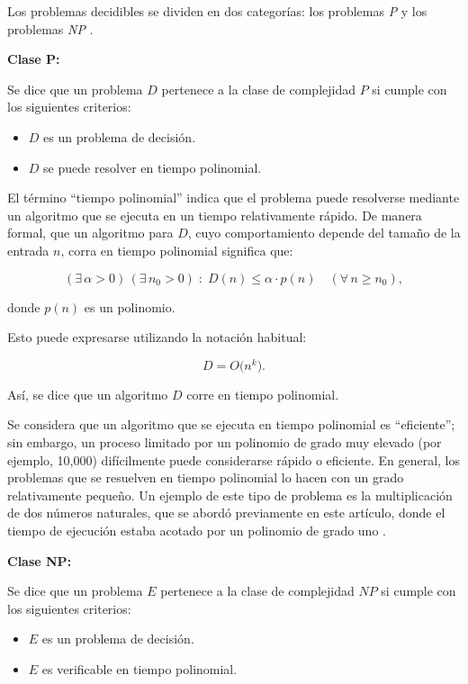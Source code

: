 \documentclass[12pt,titlepage,twoside,openright]{book}
\begin{document}
Los problemas decidibles se dividen en dos categorías: los problemas \emph{P} y los problemas \emph{NP} \citep{maldonado2013problema}.

\textbf{Clase P:}

Se dice que un problema \(D\) pertenece a la clase de complejidad \(P\) si cumple con los siguientes criterios:

\begin{itemize}
	\item \(D\) es un problema de decisión.
	\item \(D\) se puede resolver en tiempo polinomial.
\end{itemize}

El término “tiempo polinomial” indica que el problema puede resolverse mediante un algoritmo que se ejecuta en un tiempo relativamente rápido. De manera formal, que un algoritmo para \(D\), cuyo comportamiento depende del tamaño de la entrada \(n\), corra en tiempo polinomial significa que:

\[
	(\exists\,\alpha > 0)\,(\exists\,n_0 > 0)\;:\; D(n) \leq \alpha \cdot p(n) \quad (\forall\,n \geq n_0),
\]

donde \(p(n)\) es un polinomio.

Esto puede expresarse utilizando la notación habitual:

\[
	D = O\bigl(n^k\bigr).
\]

Así, se dice que un algoritmo \(D\) corre en tiempo polinomial.

Se considera que un algoritmo que se ejecuta en tiempo polinomial es “eficiente”; sin embargo, un proceso limitado por un polinomio de grado muy elevado (por ejemplo, 10,000) difícilmente puede considerarse rápido o eficiente. En general, los problemas que se resuelven en tiempo polinomial lo hacen con un grado relativamente pequeño. Un ejemplo de este tipo de problema es la multiplicación de dos números naturales, que se abordó previamente en este artículo, donde el tiempo de ejecución estaba acotado por un polinomio de grado uno \citep{Flores2014}.

\textbf{Clase NP:}

Se dice que un problema \(E\) pertenece a la clase de complejidad \(NP\) si cumple con los siguientes criterios:

\begin{itemize}
	\item \(E\) es un problema de decisión.
	\item \(E\) es verificable en tiempo polinomial.
\end{itemize}
\end{document}

